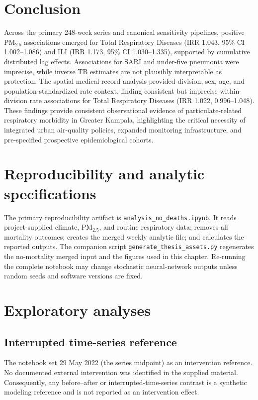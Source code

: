 \documentclass[12pt,a4paper]{report}
\newcommand{\pmfive}{PM$_{2.5}$}
\begin{document}
\chapter{Conclusion}
Across the primary 248-week series and canonical sensitivity pipelines, positive \pmfive{} associations emerged for Total Respiratory Diseases (IRR 1.043, 95\% CI 1.002--1.086) and ILI (IRR 1.173, 95\% CI 1.030--1.335), supported by cumulative distributed lag effects. Associations for SARI and under-five pneumonia were imprecise, while inverse TB estimates are not plausibly interpretable as protection. The spatial medical-record analysis provided division, sex, age, and population-standardized rate context, finding consistent but imprecise within-division rate associations for Total Respiratory Diseases (IRR 1.022, 0.996--1.048). These findings provide consistent observational evidence of particulate-related respiratory morbidity in Greater Kampala, highlighting the critical necessity of integrated urban air-quality policies, expanded monitoring infrastructure, and pre-specified prospective epidemiological cohorts.

\appendix
\chapter{Reproducibility and analytic specifications}
The primary reproducibility artifact is \texttt{analysis\_no\_deaths.ipynb}. It reads project-supplied climate, \pmfive{}, and routine respiratory data; removes all mortality outcomes; creates the merged weekly analytic file; and calculates the reported outputs. The companion script \texttt{generate\_thesis\_assets.py} regenerates the no-mortality merged input and the figures used in this chapter. Re-running the complete notebook may change stochastic neural-network outputs unless random seeds and software versions are fixed.

\chapter{Exploratory analyses}\label{app:exploratory}
\section{Interrupted time-series reference}
The notebook set 29 May 2022 (the series midpoint) as an intervention reference. No documented external intervention was identified in the supplied material. Consequently, any before--after or interrupted-time-series contrast is a synthetic modeling reference and is not reported as an intervention effect.
\end{document}
